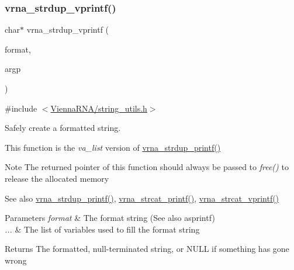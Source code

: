 \subsubsection{\texorpdfstring{vrna\+\_\+strdup\+\_\+vprintf()}{vrna\_strdup\_vprintf()}}
{\footnotesize\ttfamily char$\ast$ vrna\+\_\+strdup\+\_\+vprintf (\begin{DoxyParamCaption}\item[{const char $\ast$}]{format,  }\item[{va\+\_\+list}]{argp }\end{DoxyParamCaption})}



{\ttfamily \#include $<$\mbox{\hyperlink{string__utils_8h}{Vienna\+R\+N\+A/string\+\_\+utils.\+h}}$>$}



Safely create a formatted string. 

This function is the {\itshape va\+\_\+list} version of \mbox{\hyperlink{group__string__utils_ga33cc0190a326ec368277caa777b8bf18}{vrna\+\_\+strdup\+\_\+printf()}}

\begin{DoxyNote}{Note}
The returned pointer of this function should always be passed to {\itshape free()} to release the allocated memory
\end{DoxyNote}
\begin{DoxySeeAlso}{See also}
\mbox{\hyperlink{group__string__utils_ga33cc0190a326ec368277caa777b8bf18}{vrna\+\_\+strdup\+\_\+printf()}}, \mbox{\hyperlink{group__string__utils_gac0771ec71316023067f2aae61a5aa0fb}{vrna\+\_\+strcat\+\_\+printf()}}, \mbox{\hyperlink{group__string__utils_ga122df216996ba62fd5056b7743e3131a}{vrna\+\_\+strcat\+\_\+vprintf()}}
\end{DoxySeeAlso}

\begin{DoxyParams}{Parameters}
{\em format} & The format string (See also asprintf) \\
\hline
{\em ...} & The list of variables used to fill the format string \\
\hline
\end{DoxyParams}
\begin{DoxyReturn}{Returns}
The formatted, null-\/terminated string, or N\+U\+LL if something has gone wrong 
\end{DoxyReturn}
\mbox{\label{group__string__utils_gac0771ec71316023067f2aae61a5aa0fb}} 
